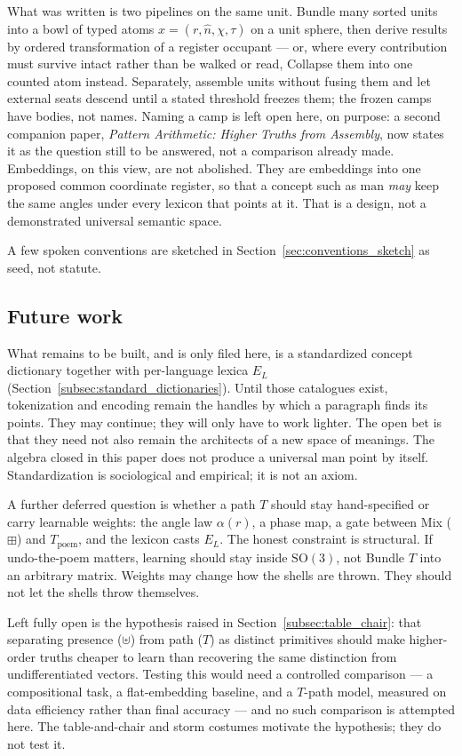 \documentclass[12pt, a4paper]{article}
\begin{document}
What was written is two pipelines on the same unit. Bundle many
sorted units into a bowl of typed atoms $x=(r,\hat n,\chi,\tau)$ on a
unit sphere, then derive results by ordered transformation of a
register occupant --- or, where every contribution must survive
intact rather than be walked or read, Collapse them into one counted
atom instead. Separately, assemble units without fusing them
and let external seats descend until a stated threshold freezes
them; the frozen camps have bodies, not names. Naming a camp is
left open here, on purpose: a second companion paper,
\emph{Pattern Arithmetic: Higher Truths from Assembly}, now states
it as the question still to be answered, not a comparison already
made.
Embeddings, on this view, are
not abolished. They are embeddings into one proposed common coordinate
register, so that a
concept such as $\mathrm{man}$ \emph{may} keep the same angles under every
lexicon that points at it. That is a design, not a demonstrated
universal semantic space.

A few spoken conventions are sketched in
Section~\ref{sec:conventions_sketch} as seed, not statute.

\subsection{Future work}
\label{subsec:future_work}
What remains to be built, and is only filed here, is a standardized
concept dictionary together with per-language lexica $E_L$
(Section~\ref{subsec:standard_dictionaries}). Until those catalogues
exist, tokenization and encoding remain the handles by which a
paragraph finds its points. They may continue; they will only have to
work lighter. The open bet is that they need not also
remain the architects of a new space of meanings.
The algebra closed in this paper does not produce a universal
$\mathrm{man}$ point by itself. Standardization is sociological and
empirical; it is not an axiom.

A further deferred question is whether a path $T$ should stay
hand-specified or carry learnable weights: the angle law
$\alpha(r)$, a phase map, a gate between Mix ($\boxplus$) and
$T_{\mathrm{poem}}$, and the lexicon casts $E_L$. The honest
constraint is structural. If undo-the-poem matters, learning should
stay inside $\mathrm{SO}(3)$, not Bundle $T$ into an arbitrary
matrix. Weights may change how the shells are thrown. They should
not let the shells throw themselves.

Left fully open is the hypothesis raised in
Section~\ref{subsec:table_chair}: that separating presence
($\uplus$) from path ($T$) as distinct primitives should make
higher-order truths cheaper to learn than recovering the same
distinction from undifferentiated vectors. Testing this would need a
controlled comparison --- a compositional task, a flat-embedding
baseline, and a $T$-path model, measured on data efficiency rather
than final accuracy --- and no such comparison is attempted here.
The table-and-chair and storm costumes motivate the hypothesis; they
do not test it.
\end{document}
